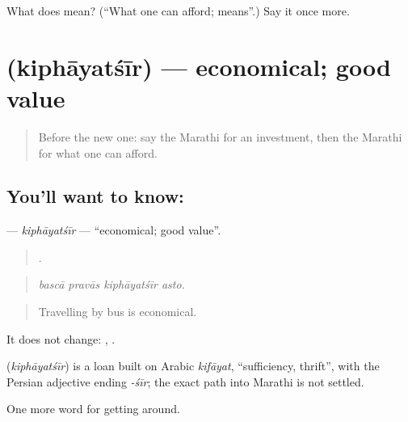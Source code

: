 \begin{tcolorbox}[breakable,colback=teal!4,colframe=teal!35!black,title={Before you move on}]
What does  mean? (\textquotedblleft{}What one can afford; means\textquotedblright{}.) Say it once more.
\end{tcolorbox}
\section[\texorpdfstring{\mr{किफायतशीर} (kiphāyatśīr)}{किफायतशीर (kiphāyatśīr)}]{ (kiphāyatśīr) — economical; good value}

\label{lesson:MR-C428-kiphayatsir}



\begin{quote}
Before the new one: say the Marathi for an investment, then the Marathi for what one can afford.
\end{quote}

\subsection*{You'll want to know: }
\textbf{} — \emph{kiphāyatśīr} — \textquotedblleft{}economical; good value\textquotedblright{}.

\begin{quote}
   .
\end{quote}

\begin{quote}
\emph{bascā pravās kiphāyatśīr asto.}
\end{quote}

\begin{quote}
Travelling by bus is economical.
\end{quote}

It does not change:  ,  .

\begin{cousinweb}
\textbf{} (\emph{kiphāyatśīr}) is a loan built on Arabic \emph{kifāyat}, \textquotedblleft{}sufficiency, thrift\textquotedblright{}, with the Persian adjective ending \emph{-śīr}; the exact path into Marathi is not settled.
\end{cousinweb}

\begin{grammarlens}[title={What you've built}]
One more word for getting around.
\end{grammarlens}

